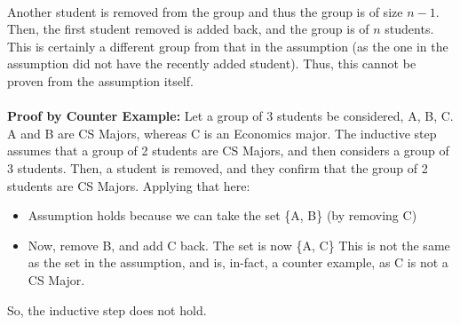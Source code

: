 \documentclass[a4paper]{article}
\begin{document}
\begin{enumerate}
\\
Another student is removed from the group and thus the group is of size $n - 1$. Then, the first student removed is added back, and the group is of $n$ students. This is certainly a different group from that in the assumption (as the one in the assumption did not have the recently added student). Thus, this cannot be proven from the assumption itself. \\
\\
\textbf{Proof by Counter Example:} Let a group of 3 students be considered, A, B, C. A and B are CS Majors, whereas C is an Economics major. The inductive step assumes that a group of 2 students are CS Majors, and then considers a group of 3 students. Then, a student is removed, and they confirm that the group of 2 students are CS Majors. Applying that here:
\begin{itemize}
    \item Assumption holds because we can take the set \{A, B\} (by removing C)
    \item Now, remove B, and add C back. The set is now \{A, C\} This is not the same as the set in the assumption, and is, in-fact, a counter example, as C is not a CS Major. 
\end{itemize}
So, the inductive step does not hold.
\end{enumerate}
\end{document}
